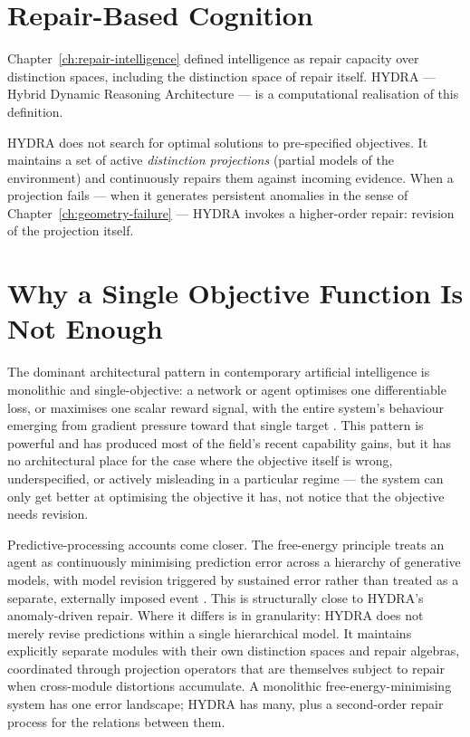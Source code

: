 \documentclass[12pt,twoside,openright]{book}
\begin{document}
\section{Repair-Based Cognition}

Chapter~\ref{ch:repair-intelligence} defined intelligence
as repair capacity over distinction spaces, including
the distinction space of repair itself. HYDRA —
Hybrid Dynamic Reasoning Architecture — is a
computational realisation of this definition.

HYDRA does not search for optimal solutions to
pre-specified objectives. It maintains a set of
active \emph{distinction projections} (partial models
of the environment) and continuously repairs them
against incoming evidence. When a projection fails —
when it generates persistent anomalies in the sense of
Chapter~\ref{ch:geometry-failure} — HYDRA invokes a
higher-order repair: revision of the projection itself.

\section{Why a Single Objective Function Is Not Enough}
\label{sec:ch25-why-monolithic}

The dominant architectural pattern in contemporary artificial
intelligence is monolithic and single-objective: a network
or agent optimises one differentiable loss, or maximises one
scalar reward signal, with the entire system's behaviour
emerging from gradient pressure toward that single target
\parencite{sutton2018}. This pattern is powerful and has
produced most of the field's recent capability gains, but it
has no architectural place for the case where the objective
itself is wrong, underspecified, or actively misleading in a
particular regime --- the system can only get better at
optimising the objective it has, not notice that the objective
needs revision.

Predictive-processing accounts come closer. The free-energy
principle treats an agent as continuously minimising prediction
error across a hierarchy of generative models, with model
revision triggered by sustained error rather than treated as a
separate, externally imposed event \parencite{friston2010}.
This is structurally close to HYDRA's anomaly-driven repair.
Where it differs is in granularity: HYDRA does not merely
revise predictions within a single hierarchical model. It
maintains explicitly separate modules with their own
distinction spaces and repair algebras, coordinated through
projection operators that are themselves subject to repair when
cross-module distortions accumulate. A monolithic
free-energy-minimising system has one error landscape; HYDRA
has many, plus a second-order repair process for the relations
between them.
\end{document}

